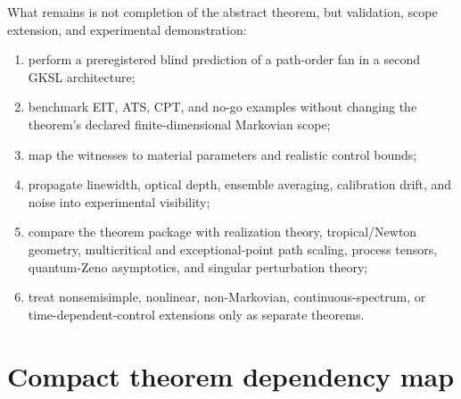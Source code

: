 \documentclass[11pt]{article}
\theoremstyle{definition}
\theoremstyle{remark}
\theoremstyle{plain}
\begin{document}
What remains is not completion of the abstract theorem, but validation,
scope extension, and experimental demonstration:
\begin{enumerate}[label=(\roman*)]
 \item perform a preregistered blind prediction of a path-order fan in a
 second GKSL architecture;
 \item benchmark EIT, ATS, CPT, and no-go examples without changing the
 theorem's declared finite-dimensional Markovian scope;
 \item map the witnesses to material parameters and realistic control bounds;
 \item propagate linewidth, optical depth, ensemble averaging, calibration
 drift, and noise into experimental visibility;
 \item compare the theorem package with realization theory, tropical/Newton
 geometry, multicritical and exceptional-point path scaling, process tensors,
 quantum-Zeno asymptotics, and singular perturbation theory;
 \item treat nonsemisimple, nonlinear, non-Markovian, continuous-spectrum, or
 time-dependent-control extensions only as separate theorems.
\end{enumerate}

\section{Compact theorem dependency map}
\end{document}
